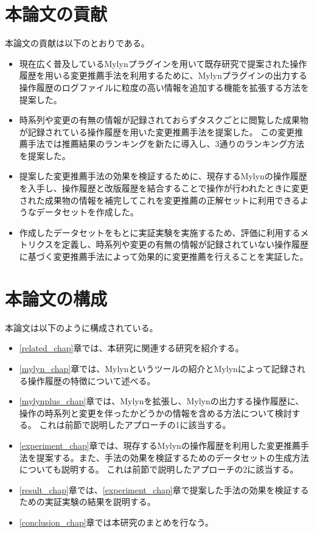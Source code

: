 \documentclass[a4paper]{jsbook}
\begin{document}
\section{本論文の貢献}
本論文の貢献は以下のとおりである。
\begin{itemize}
  \item 現在広く普及しているMylynプラグインを用いて既存研究で提案された操作履歴を用いる変更推薦手法を利用するために、Mylynプラグインの出力する操作履歴のログファイルに粒度の高い情報を追加する機能を拡張する方法を提案した。
  \item 時系列や変更の有無の情報が記録されておらずタスクごとに閲覧した成果物が記録されている操作履歴を用いた変更推薦手法を提案した。
    この変更推薦手法では推薦結果のランキングを新たに導入し、3通りのランキング方法を提案した。
  \item 提案した変更推薦手法の効果を検証するために、現存するMylynの操作履歴を入手し、操作履歴と改版履歴を結合することで操作が行われたときに変更された成果物の情報を補完してこれを変更推薦の正解セットに利用できるようなデータセットを作成した。
  \item 作成したデータセットをもとに実証実験を実施するため、評価に利用するメトリクスを定義し、時系列や変更の有無の情報が記録されていない操作履歴に基づく変更推薦手法によって効果的に変更推薦を行えることを実証した。
\end{itemize}

\section{本論文の構成}
本論文は以下のように構成されている。
\begin{itemize}
  \item \ref{related_chap}章では、本研究に関連する研究を紹介する。
  \item \ref{mylyn_chap}章では、Mylynというツールの紹介とMylynによって記録される操作履歴の特徴について述べる。
  \item \ref{mylynplus_chap}章では、Mylynを拡張し、Mylynの出力する操作履歴に、操作の時系列と変更を伴ったかどうかの情報を含める方法について検討する。
    これは前節で説明したアプローチの1に該当する。
  \item \ref{experiment_chap}章では、現存するMylynの操作履歴を利用した変更推薦手法を提案する。また、手法の効果を検証するためのデータセットの生成方法についても説明する。
    これは前節で説明したアプローチの2に該当する。
  \item \ref{result_chap}章では、\ref{experiment_chap}章で提案した手法の効果を検証するための実証実験の結果を説明する。
  \item \ref{conclusion_chap}章では本研究のまとめを行なう。
\end{itemize}
\end{document}
